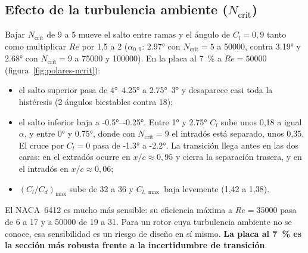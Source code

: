 \subsection{Efecto de la turbulencia ambiente ($N_{\text{crit}}$)}
Bajar $N_{\text{crit}}$ de 9 a 5 mueve el salto entre ramas y el ángulo de $C_l=0{,}9$
tanto como multiplicar $Re$ por 1,5 a 2 ($\alpha_{0,9}$: \ang{2.97} con $N_{\text{crit}}=5$
a \num{50000}, contra \ang{3.19} y \ang{2.68} con $N_{\text{crit}}=9$ a \num{75000} y
\num{100000}). En la placa al \SI{7}{\percent} a $Re=\num{50000}$
(figura~\ref{fig:polares-ncrit}):
\begin{itemize}
  \item el salto superior pasa de \ang{4}--\ang{4.25} a \ang{2.75}--\ang{3} y
        desaparece casi toda la histéresis (2 ángulos biestables contra 18);
  \item el salto inferior baja a \ang{-0.5}--\ang{-0.25}. Entre \ang{1} y \ang{2.75}
        $C_l$ sube unos 0,18 a igual $\alpha$, y entre \ang{0} y \ang{0.75}, donde con
        $N_{\text{crit}}=9$ el intradós está separado, unos 0,35. El cruce por $C_l=0$
        pasa de \ang{-1.3} a \ang{-2.2}. La transición llega antes en las dos caras: en
        el extradós ocurre en $x/c\approx0{,}95$ y cierra la separación trasera, y en el
        intradós en $x/c\approx0{,}06$;
  \item $(C_l/C_d)_{\max}$ sube de 32 a 36 y $C_{l,\max}$ baja levemente (1,42 a 1,38).
\end{itemize}
El NACA~6412 es mucho más sensible: su eficiencia máxima a $Re=\num{35000}$ pasa de 6 a
17 y a \num{50000} de 19 a 31. Para un rotor cuya turbulencia ambiente no se conoce, esa
sensibilidad es un riesgo de diseño en sí mismo. \textbf{La placa al \SI{7}{\percent} es
la sección más robusta frente a la incertidumbre de transición}.

